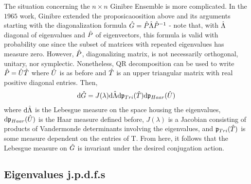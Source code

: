 The situation concerning the $n \times n$ Ginibre Ensemble is more complicated. In the $1965$ work, Ginibre extended the proposicaoosition above and its arguments starting with the diagonalization formula $\hat G = \hat P\hat\Lambda\hat P^{-1}$ - note that, with $\hat\Lambda$ diagonal of eigenvalues and $\hat P$ of eigenvectors, this formula is valid with probability one since the subset of matrices with repeated eigenvalues has measure zero. However, $\hat P$, diagonalizing matrix, is not necessarily orthogonal, unitary, nor symplectic. Nonetheless, QR decomposition can be used to write $\hat P = \hat U\hat T$ where $\hat U$ is as before and $\hat T$ is an upper triangular matrix with real positive diagonal entries. Then,
\begin{equation}
	\mathrm{d} \hat G = J(\lambda) \mathrm{d} \hat\Lambda \mathrm{d} \mathfrak{p}_{Tri}(\hat T) \mathrm{d} \mathfrak{p}_{Haar}(\hat U)
\end{equation}
where $\mathrm{d} \hat\Lambda$ is the Lebesgue measure on the space housing the eigenvalues, $\mathrm{d} \mathfrak{p}_{Haar}(\hat U)$ is the Haar measure defined before, $J(\lambda)$ is a Jacobian consisting of products of Vandermonde determinants involving the eigenvalues, and $\mathfrak{p}_{Tri}(\hat T)$ is some measure dependent on the entries of T. From here, it follows that the Lebesgue measure on $\hat G$ is invariant under the desired conjugation action.

\subsection{Eigenvalues j.p.d.f.s}

